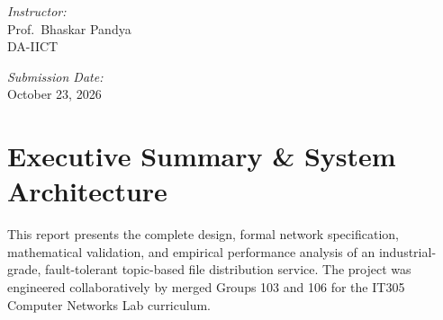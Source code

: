 \documentclass[11pt,a4paper]{article}
\begin{document}
\begin{titlepage}
    \vfill
    
    \begin{minipage}{0.48\textwidth}
        \begin{flushleft} \large
            \emph{Instructor:}\\
            Prof.~Bhaskar Pandya\\
            DA-IICT
        \end{flushleft}
    \end{minipage}
    \hfill
    \begin{minipage}{0.48\textwidth}
        \begin{flushright} \large
            \emph{Submission Date:}\\
            October 23, 2026
        \end{flushright}
    \end{minipage}
\end{titlepage}

\tableofcontents
\newpage

\section{Executive Summary \& System Architecture}

This report presents the complete design, formal network specification, mathematical validation, and empirical performance analysis of an industrial-grade, fault-tolerant topic-based file distribution service. The project was engineered collaboratively by merged Groups 103 and 106 for the IT305 Computer Networks Lab curriculum.
\end{document}
